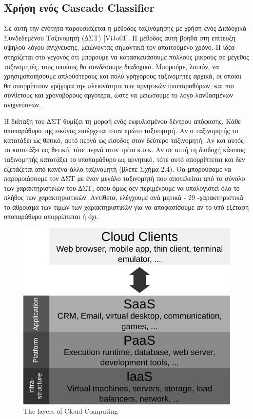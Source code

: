 \subsection{Χρήση ενός Cascade Classifier}

Σε αυτή την ενότητα παρουσιάζεται η μέθοδος ταξινόμησης με χρήση ενός ∆ιαδοχικά
Συνδεδεμένου Ταξινομητή (∆ΣΤ) [ViJo01]. Η μέθοδος αυτή βοηθά στη επίτευξη υψηλού λόγου
ανίχνευσης, μειώνοντας σημαντικά τον απαιτούμενο χρόνο. Η ιδέα στηρίζεται στο γεγονός ότι
μπορούμε να κατασκευάσουμε πολλούς μικρούς σε μέγεθος ταξινομητές, τους οποίους θα
συνδέσουμε διαδοχικά. Μπορούμε, λοιπόν, να χρησιμοποιήσουμε απλούστερους και πολύ
γρήγορους ταξινομητές αρχικά, οι οποίοι θα απορρίπτουν γρήγορα την πλειονότητα των
αρνητικών υποπαραθύρων, και πιο σύνθετους και χρονοβόρους αργότερα, ώστε να μειώσουμε το
λόγο λανθασμένων ανιχνεύσεων.

Η διάταξη του ∆ΣΤ θυμίζει τη μορφή ενός εκφυλισμένου δέντρου απόφασης. Κάθε
υποπαράθυρο της εικόνας εισέρχεται στον πρώτο ταξινομητή. Αν ο ταξινομητής το κατατάξει ως
θετικό, αυτό περνά ως είσοδος στον δεύτερο ταξινομητή. Αν και αυτός το κατατάξει ως θετικό,
τότε περνά στον τρίτο κ.ο.κ. Αν σε αυτή τη διαδοχή κάποιος ταξινομητής κατατάξει το
υποπαράθυρο ως αρνητικό, τότε αυτό απορρίπτεται και δεν εξετάζεται από κανένα άλλο
ταξινομητή (βλέπε Σχήμα 2.4). Θα μπορούσαμε να παρομοιάσουμε τον ∆ΣΤ με έναν μεγάλο
ταξινομητή που αποτελείται από το σύνολο των χαρακτηριστικών του ∆ΣΤ, όπου όμως δεν
περιμένουμε να υπολογιστεί όλο το πλήθος των χαρακτηριστικών. Αντίθετα, ελέγχουμε ανά μερικά
- 29 -χαρακτηριστικά το άθροισμα των τιμών των χαρακτηριστικών για να αποφασίσουμε αν το υπό
εξέταση υποπαράθυρο απορρίπτεται ή όχι.

\begin{figure}[htbp]
  \begin{center}
    \includegraphics[width=1.0\maxwidth]{../figures/cloud_layers-black.pdf}
    \caption{The layers of Cloud Computing\label{fig:cloud_layers}}
   \end{center}
\end{figure}
